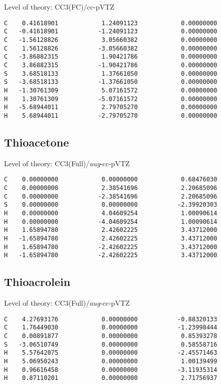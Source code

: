 \documentclass[journal=jctcce,manuscript=article,layout=traditional]{achemso}
\newcommand{\TZ}{cc-pVTZ}
\newcommand{\AVTZ}{\emph{aug}-cc-pVTZ}
\begin{document}
\begin{singlespace}
Level of theory: CC3(FC)/{\TZ}
\begin{verbatim}
C    0.41618901            1.24091123            0.00000000
C   -0.41618901           -1.24091123            0.00000000
C   -1.56128826            3.05660382            0.00000000
C    1.56128826           -3.05660382            0.00000000
C   -3.86882315            1.90421786            0.00000000
C    3.86882315           -1.90421786            0.00000000
S    3.68518133            1.37661050            0.00000000
S   -3.68518133           -1.37661050            0.00000000
H   -1.30761309            5.07161572            0.00000000
H    1.30761309           -5.07161572            0.00000000
H   -5.68944011            2.79705270            0.00000000
H    5.68944011           -2.79705270            0.00000000
\end{verbatim}
\end{singlespace}

\subsection*{Thioacetone}

\begin{singlespace}
Level of theory: CC3(Full)/{\AVTZ}
\begin{verbatim}
C    0.00000000            0.00000000            0.68476030
C    0.00000000            2.38541696            2.20685096
C    0.00000000           -2.38541696            2.20685096
S    0.00000000            0.00000000           -2.39920303
H    0.00000000            4.04609254            1.00090614
H    0.00000000           -4.04609254            1.00090614
H    1.65894780            2.42602225            3.43712000
H   -1.65894780            2.42602225            3.43712000
H    1.65894780           -2.42602225            3.43712000
H   -1.65894780           -2.42602225            3.43712000
\end{verbatim}
\end{singlespace}

\subsection*{Thioacrolein}

\begin{singlespace}
Level of theory: CC3(Full)/{\AVTZ}
\begin{verbatim}
C    4.27693176            0.00000000           -0.88320133
C    1.76449030            0.00000000           -1.23998444
C    0.00891877            0.00000000            0.85393278
S   -3.06510749            0.00000000            0.58558716
H    5.57642075            0.00000000           -2.45571463
H    5.06950243            0.00000000            1.00139499
H    0.96616458            0.00000000           -3.11935314
H    0.87110201            0.00000000            2.71756937
\end{verbatim}
\end{singlespace}
\end{document}
